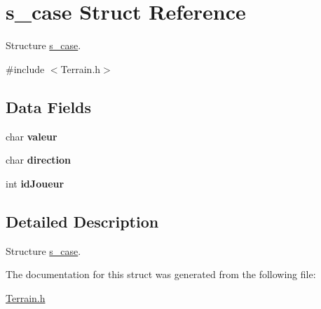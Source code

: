 \hypertarget{structs__case}{\section{s\-\_\-case Struct Reference}
\label{structs__case}
}


Structure \hyperlink{structs__case}{s\-\_\-case}.  




{\ttfamily \#include $<$Terrain.\-h$>$}

\subsection*{Data Fields}
\begin{DoxyCompactItemize}
\item 
\hypertarget{structs__case_a463f37aadd96667dd2461c4ee8bfc29b}{char {\bfseries valeur}}\label{structs__case_a463f37aadd96667dd2461c4ee8bfc29b}

\item 
\hypertarget{structs__case_a210b3e6ffb6e047c4ae6e2c0e737ed52}{char {\bfseries direction}}\label{structs__case_a210b3e6ffb6e047c4ae6e2c0e737ed52}

\item 
\hypertarget{structs__case_a54ff83d23a4b04c30770106e14ab1c85}{int {\bfseries id\-Joueur}}\label{structs__case_a54ff83d23a4b04c30770106e14ab1c85}

\end{DoxyCompactItemize}


\subsection{Detailed Description}
Structure \hyperlink{structs__case}{s\-\_\-case}. 

The documentation for this struct was generated from the following file\-:\begin{DoxyCompactItemize}
\item 
\hyperlink{_terrain_8h}{Terrain.\-h}\end{DoxyCompactItemize}
